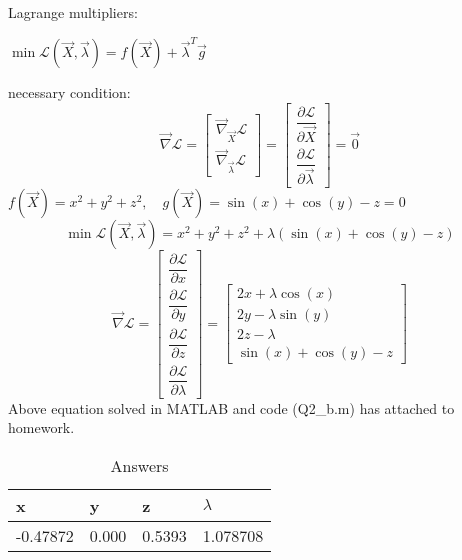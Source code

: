 Lagrange multipliers:


$\min \mathcal{L}(\vec{X}, \vec{\lambda}) = f(\vec{X}) +\vec{\lambda}^T \vec{g}$

necessary condition:
$$\vec{\nabla} \mathcal{L}  =  \begin{bmatrix}
	 \vec{\nabla}_{\vec{X}} \mathcal{L} \\[6pt]
	 \vec{\nabla}_{\vec{\lambda}} \mathcal{L}
\end{bmatrix} = \begin{bmatrix}
\dfrac{\partial \mathcal{L}}{\partial \vec{X}} \\[10pt]
\dfrac{\partial \mathcal{L}}{\partial \vec{\lambda}}
\end{bmatrix} = \vec{0}$$
$f(\vec{X}) = x^2 + y^2 + z^2, \quad  g(\vec{X}) = \sin(x) + \cos(y) - z = 0$
$$\min \mathcal{L}(\vec{X}, \vec{\lambda}) = x^2 + y^2 + z^2 + \lambda (\sin(x) + \cos(y) - z)$$
$$\vec{\nabla} \mathcal{L} = \begin{bmatrix}
	\dfrac{\partial \mathcal{L}}{\partial x} \\[10pt]
	\dfrac{\partial \mathcal{L}}{\partial y} \\[10pt]
	\dfrac{\partial \mathcal{L}}{\partial z} \\[10pt]
	\dfrac{\partial \mathcal{L}}{\partial \lambda}
\end{bmatrix}  = \begin{bmatrix}
2x + \lambda\cos(x) \\
2y - \lambda\sin(y) \\
2z - \lambda \\
\sin(x) + \cos(y) -z
\end{bmatrix}$$
Above equation solved in MATLAB and code (Q2\_b.m) has attached to homework.
\begin{table}[H]
	\caption {Answers} \label{ans} 
	\begin{center}
		\begin{tabular}{| l | l | l | l |}
			\hline
			x & y & z & $\lambda$ \TBstrut \\
			\hline
			-0.47872 & 0.000 & 0.5393 & 1.078708 \Tstrut\\
			\hline
		\end{tabular}
	\end{center}
\end{table}
